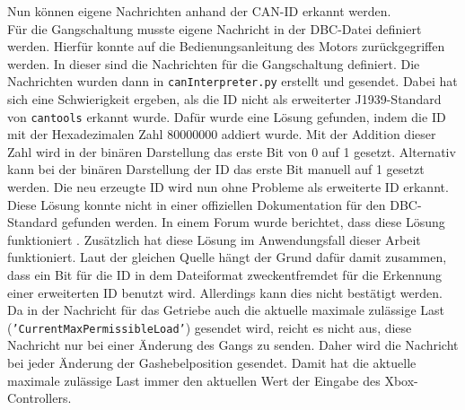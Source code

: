 Nun können eigene Nachrichten 
anhand der CAN-ID erkannt werden.\\
Für die Gangschaltung musste eigene Nachricht in der DBC-Datei definiert werden. Hierfür konnte auf die Bedienungsanleitung
des Motors zurückgegriffen werden. In dieser sind die Nachrichten für die Gangschaltung definiert.
Die Nachrichten wurden dann in \texttt{canInterpreter.py} erstellt und gesendet.
Dabei hat sich eine Schwierigkeit ergeben, als die ID nicht als erweiterter J1939-Standard von \texttt{cantools} erkannt wurde. 
Dafür wurde eine Lösung gefunden, indem die ID mit der Hexadezimalen Zahl 80000000 addiert wurde. Mit der Addition dieser Zahl
wird in der binären Darstellung das erste Bit von 0 auf 1 gesetzt. Alternativ kann bei der binären Darstellung der ID das erste Bit
manuell auf 1 gesetzt werden. Die neu erzeugte ID
wird nun ohne Probleme als erweiterte ID erkannt. Diese Lösung konnte nicht in einer offiziellen Dokumentation für den
DBC-Standard gefunden werden. In einem Forum wurde berichtet, dass diese Lösung funktioniert \cite{cantoolsIssue}. 
Zusätzlich hat diese Lösung im Anwendungsfall dieser Arbeit funktioniert. 
Laut der gleichen Quelle hängt der Grund dafür damit zusammen, dass ein Bit für die ID in dem Dateiformat zweckentfremdet für
die Erkennung einer erweiterten ID benutzt wird. Allerdings kann dies nicht bestätigt werden. \\
Da in der Nachricht für das Getriebe auch die aktuelle maximale zulässige Last (\texttt{'CurrentMaxPermissibleLoad'}) gesendet wird, 
reicht es nicht aus, diese
Nachricht nur bei einer Änderung des Gangs zu senden. Daher wird die Nachricht bei jeder Änderung der Gashebelposition
gesendet. Damit hat die aktuelle maximale zulässige Last immer den aktuellen Wert der Eingabe des Xbox-Controllers.